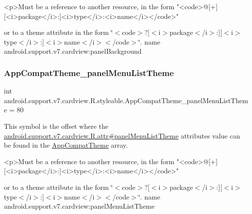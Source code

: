\begin{DoxyVerb}      <p>Must be a reference to another resource, in the form "<code>@[+][<i>package</i>:]<i>type</i>:<i>name</i></code>"
\end{DoxyVerb}
 or to a theme attribute in the form \char`\"{}$<$code$>$?\mbox{[}$<$i$>$package$<$/i$>$\+:\mbox{]}\mbox{[}$<$i$>$type$<$/i$>$\+:\mbox{]}$<$i$>$name$<$/i$>$$<$/code$>$\char`\"{}.  name android.\+support.\+v7.\+cardview\+:panel\+Background \mbox{\label{classandroid_1_1support_1_1v7_1_1cardview_1_1R_1_1styleable_a11a1d1569aae164daa489fb3f50bd2b6}} 
\subsubsection{\texorpdfstring{App\+Compat\+Theme\+\_\+panel\+Menu\+List\+Theme}{AppCompatTheme\_panelMenuListTheme}}
{\footnotesize\ttfamily int android.\+support.\+v7.\+cardview.\+R.\+styleable.\+App\+Compat\+Theme\+\_\+panel\+Menu\+List\+Theme = 80\hspace{0.3cm}{\ttfamily [static]}}

This symbol is the offset where the \hyperlink{classandroid_1_1support_1_1v7_1_1cardview_1_1R_1_1attr_ae76b891c2296dc0263664453f122e497}{android.\+support.\+v7.\+cardview.\+R.\+attr\#panel\+Menu\+List\+Theme} attribute\textquotesingle{}s value can be found in the \hyperlink{classandroid_1_1support_1_1v7_1_1cardview_1_1R_1_1styleable_a52e6f69f954ecc2622d72c0b4d298938}{App\+Compat\+Theme} array.

\begin{DoxyVerb}      <p>Must be a reference to another resource, in the form "<code>@[+][<i>package</i>:]<i>type</i>:<i>name</i></code>"
\end{DoxyVerb}
 or to a theme attribute in the form \char`\"{}$<$code$>$?\mbox{[}$<$i$>$package$<$/i$>$\+:\mbox{]}\mbox{[}$<$i$>$type$<$/i$>$\+:\mbox{]}$<$i$>$name$<$/i$>$$<$/code$>$\char`\"{}.  name android.\+support.\+v7.\+cardview\+:panel\+Menu\+List\+Theme \mbox{\label{classandroid_1_1support_1_1v7_1_1cardview_1_1R_1_1styleable_a2f64ef2552f266f4bb03dd99b70b4aa3}} 
